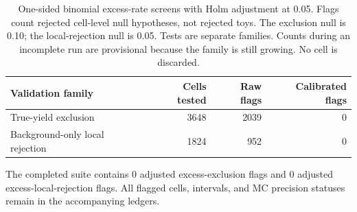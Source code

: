 \begin{table}[H]\centering\small
\begin{tabular}{lrrr}\toprule
Validation family & Cells tested & Raw flags & Calibrated flags\\\midrule
True-yield exclusion & 3648 & 2039 & 0\\
Background-only local rejection & 1824 & 952 & 0\\
\bottomrule\end{tabular}
\caption{One-sided binomial excess-rate screens with Holm adjustment at 0.05. Flags count rejected cell-level null hypotheses, not rejected toys. The exclusion null is 0.10; the local-rejection null is 0.05. Tests are separate families. Counts during an incomplete run are provisional because the family is still growing. No cell is discarded.}
\end{table}
The completed suite contains 0 adjusted excess-exclusion flags and 0 adjusted excess-local-rejection flags. All flagged cells, intervals, and MC precision statuses remain in the accompanying ledgers.
